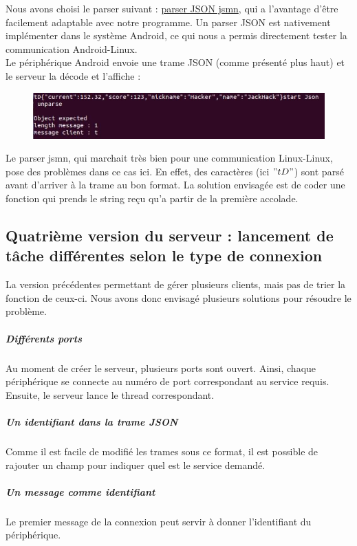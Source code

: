 \documentclass[a4paper,10pt]{article}
\begin{document}
Nous avons choisi le parser suivant : \href{https://bitbucket.org/zserge/jsmn/wiki/Home}{parser JSON jsmn}, qui a l'avantage d'être facilement adaptable avec notre programme. Un parser JSON est nativement implémenter dans le système Android, ce qui nous a permis directement tester la communication Android-Linux. \\ 
Le périphérique Android envoie une trame JSON (comme présenté plus haut) et le serveur la décode et l'affiche : 
\begin{figure}[H]
\centering\includegraphics[scale=0.7]{images/test_JSON_litle.jpg}
\end{figure}

Le parser jsmn, qui marchait très bien pour une communication Linux-Linux, pose des problèmes dans ce cas ici. En effet, des caractères (ici $"tD"$) sont parsé avant d'arriver à la trame au bon format. La solution envisagée est de coder une fonction qui prends le string reçu qu'a partir de la première accolade.



\subsection{Quatrième version du serveur : lancement de tâche différentes selon le type de connexion}

La version précédentes permettant de gérer plusieurs clients, mais pas de trier la fonction de ceux-ci. Nous avons donc envisagé plusieurs solutions pour résoudre le problème. 

\subparagraph{Différents ports} Au moment de créer le serveur, plusieurs ports sont ouvert. Ainsi, chaque périphérique se connecte au numéro de port correspondant au service requis. Ensuite, le serveur lance le thread correspondant.

\subparagraph{Un identifiant dans la trame JSON} Comme il est facile de modifié les trames sous ce format, il est possible de rajouter un champ pour indiquer quel est le service demandé. 

\subparagraph{Un message comme identifiant} Le premier message de la connexion peut servir à donner l'identifiant du périphérique.
\end{document}
